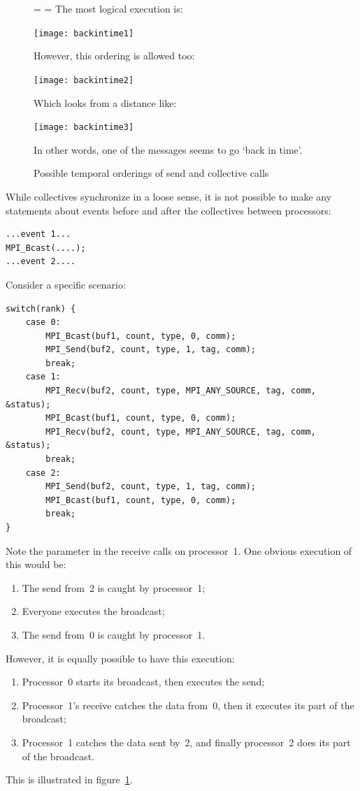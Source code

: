 \begin{figure}[p]
  \footnotesize
  \leftskip=\unitindent
  \rightskip=\unitindent
The most logical execution is:\par\medskip

\texttt{[image: backintime1]}

However, this ordering is allowed too:\par\medskip

\texttt{[image: backintime2]}

Which looks from a distance like:\par\medskip

\texttt{[image: backintime3]}

In other words, one of the messages seems to go `back in time'.

  \caption{Possible temporal orderings of send and collective calls}
  \label{fig:backintime}
\end{figure}

While collectives synchronize in a loose sense, it is not possible to
make any statements about events before and after the collectives
between processors:
\begin{lstlisting}
...event 1...
MPI_Bcast(....);
...event 2....
\end{lstlisting}
Consider a specific scenario:
\begin{lstlisting}
switch(rank) {
    case 0:
        MPI_Bcast(buf1, count, type, 0, comm);
        MPI_Send(buf2, count, type, 1, tag, comm);
        break;
    case 1:
        MPI_Recv(buf2, count, type, MPI_ANY_SOURCE, tag, comm, &status);
        MPI_Bcast(buf1, count, type, 0, comm);
        MPI_Recv(buf2, count, type, MPI_ANY_SOURCE, tag, comm, &status);
        break;
    case 2:
        MPI_Send(buf2, count, type, 1, tag, comm);
        MPI_Bcast(buf1, count, type, 0, comm);
        break;
}
\end{lstlisting}
Note the  parameter in the receive calls on processor~1.
One obvious execution of this would be:
\begin{enumerate}
\item The send from~2 is caught by processor~1;
\item Everyone executes the broadcast;
\item The send from~0 is caught by processor~1.
\end{enumerate}
However, it is equally possible to have this execution:
\begin{enumerate}
\item Processor~0 starts its broadcast, then executes the send;
\item Processor~1's receive catches the data from~0, then it executes
  its part of the broadcast;
\item Processor~1 catches the data sent by~2, and finally processor~2
  does its part of the broadcast.
\end{enumerate}

This is illustrated in figure~\ref{fig:backintime}.
